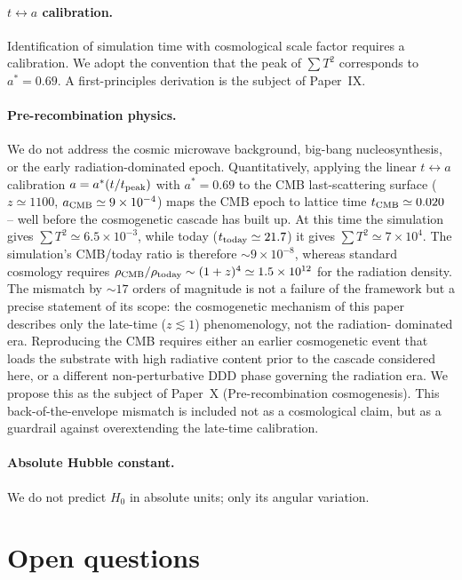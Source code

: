 \documentclass[11pt,a4paper]{article}
\begin{document}
\paragraph{$t \leftrightarrow a$ calibration.}
Identification of simulation time with cosmological scale factor
requires a calibration. We adopt the convention that the peak of
$\sum T^2$ corresponds to $a^\ast = 0.69$. A first-principles
derivation is the subject of Paper~IX.

\paragraph{Pre-recombination physics.}
We do not address the cosmic microwave background, big-bang
nucleosynthesis, or the early radiation-dominated epoch.
Quantitatively, applying the linear $t \leftrightarrow a$ calibration
$a = a^\ast (t/t_{\rm peak})$ with $a^\ast = 0.69$ to the CMB
last-scattering surface ($z \simeq 1100$, $a_{\rm CMB} \simeq 9 \times
10^{-4}$) maps the CMB epoch to lattice time $t_{\rm CMB} \simeq
0.020$ -- well before the cosmogenetic cascade has built up. At this
time the simulation gives $\sum T^2 \simeq 6.5 \times 10^{-3}$, while
today ($t_{\rm today} \simeq 21.7$) it gives $\sum T^2 \simeq 7 \times
10^4$. The simulation's CMB/today ratio is therefore
$\sim 9 \times 10^{-8}$, whereas standard cosmology requires
$\rho_{\rm CMB}/\rho_{\rm today} \sim (1+z)^4 \simeq 1.5 \times 10^{12}$
for the radiation density. The mismatch by $\sim 17$ orders of
magnitude is not a failure of the framework but a precise statement
of its scope: the cosmogenetic mechanism of this paper describes only
the late-time ($z \lesssim 1$) phenomenology, not the radiation-
dominated era. Reproducing the CMB requires either an earlier
cosmogenetic event that loads the substrate with high radiative
content prior to the cascade considered here, or a different
non-perturbative DDD phase governing the radiation era. We propose
this as the subject of Paper~X (Pre-recombination cosmogenesis).
This back-of-the-envelope mismatch is included not as a cosmological
claim, but as a guardrail against overextending the late-time
calibration.

\paragraph{Absolute Hubble constant.}
We do not predict $H_0$ in absolute units; only its angular variation.

\FloatBarrier
\section{Open questions}
\label{sec:open}
\end{document}

